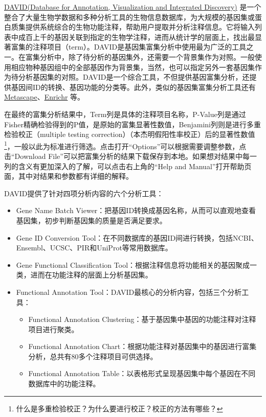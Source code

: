 \documentclass[11pt,a4paper,twoside]{book}
\begin{document}
\href{http://david.abcc.ncifcrf.gov/}{DAVID(Database for Annotation, Visualization and Integrated Discovery)} 是一个整合了大量生物学数据和多种分析工具的生物信息数据库，为大规模的基因集或蛋白质集提供系统综合的生物功能注释，帮助用户提取并分析注释信息。它将输入列表中成百上千的基因关联到指定的生物学注释，进而从统计学的层面上，找出最显著富集的注释项目（term）。DAVID是基因集富集分析中使用最为广泛的工具之一。在富集分析中，除了待分析的基因集外，还需要一个背景集作为对照。一般使用相应物种基因组中的全部基因作为背景集，当然，也可以指定另外一套基因集作为待分析基因集的对照。DAVID是一个综合工具，不但提供基因富集分析，还提供基因间ID的转换、基因功能的分类等。此外，类似的基因集富集分析工具还有 \href{http://metascape.org/gp/index.html}{Metascape}、\href{http://amp.pharm.mssm.edu/Enrichr/}{Enrichr} 等。

在最终的富集分析结果中，Term列是具体的注释项目名称，P-Value列是通过Fisher精确检验得到的P值，是原始的富集显著性数值，Benjamini列则是进行多重检验校正（multiple testing correction）（本杰明假阳性率校正）后的显著性数值\footnote{什么是多重检验校正？为什么要进行校正？校正的方法有哪些？}，一般以此为标准进行筛选。点击打开“Options”可以根据需要调整参数，点击“Download File”可以把富集分析的结果下载保存到本地。如果想对结果中每一列的含义有更加深入的了解，可以点击右上角的“Help and Manual”打开帮助页面，其中对结果和参数都有详细的解释。

DAVID提供了针对四项分析内容的六个分析工具：
\begin{itemize}
  \item Gene Name Batch Viewer：把基因ID转换成基因名称，从而可以直观地查看基因集，初步判断基因集的质量是否满足要求。
  \item Gene ID Conversion Tool：在不同数据库的基因ID间进行转换，包括NCBI、Ensembl、UCSC、PIR和UniProt等常用数据库。
  \item Gene Functional Classification Tool：根据注释信息将功能相关的基因聚成一类，进而在功能注释的层面上分析基因集。
  \item Functional Annotation Tool：DAVID最核心的分析内容，包括三个分析工具：
  \begin{itemize}
    \item Functional Annotation Clustering：基于基因集中基因的功能注释对注释项目进行聚类。
    \item Functional Annotation Chart：根据功能注释对基因集中的基因进行富集分析，总共有80多个注释项目可供选择。
    \item Functional Annotation Table：以表格形式呈现基因集中每个基因在不同数据库中的功能注释。
  \end{itemize}
\end{itemize}
\end{document}
